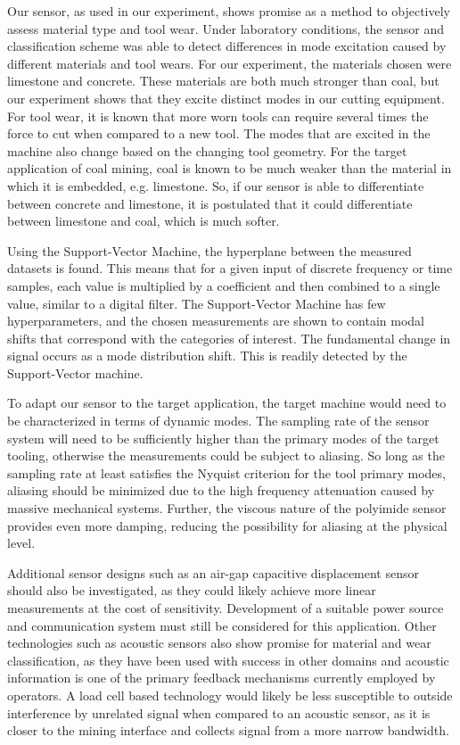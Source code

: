 Our sensor, as used in our experiment, shows promise as a method to objectively assess material type and tool wear.
Under laboratory conditions, the sensor and classification scheme was able to detect differences in 
mode excitation caused by different materials and tool wears. For our experiment, the materials chosen were
limestone and concrete. These materials are both much stronger than coal, but our experiment shows that they
excite distinct modes in our cutting equipment. For tool wear, it is known that more worn tools can
require several times the force to cut when compared to a new tool. The modes that are excited in the
machine also change based on the changing tool geometry. For the target application of coal mining,
coal is known to be much weaker than the material in which it is embedded, e.g. limestone. 
So, if our sensor is able to differentiate between concrete and limestone,
 it is postulated that it could differentiate between limestone and coal, which is much softer.

Using the Support-Vector Machine, the hyperplane between the measured datasets is found. 
This means that for a given input of discrete frequency or time samples, each value is 
 multiplied by a coefficient and then combined to a single value, similar to a digital filter. 
The Support-Vector Machine has few hyperparameters, and the chosen measurements 
 are shown to contain modal shifts that correspond with the categories of interest. 
The fundamental change in signal occurs as a mode distribution shift.
This is readily detected by the Support-Vector machine.

To adapt our sensor to the target application, 
the target machine would need to be characterized in terms of dynamic modes.
The sampling rate of the sensor system will need to be sufficiently higher than
the primary modes of the target tooling, otherwise the measurements could be subject to aliasing.
So long as the sampling rate at least satisfies the Nyquist criterion for the tool primary modes,
aliasing should be minimized due to the high frequency attenuation caused by massive mechanical systems.
Further, the viscous nature of the polyimide sensor provides even more damping, reducing the possibility
for aliasing at the physical level.

Additional sensor designs such as an air-gap capacitive displacement sensor should also be investigated,
 as they could likely achieve more linear measurements at the cost of sensitivity.
Development of a suitable power source and communication system must still be considered for this
application.
Other technologies such as acoustic sensors also show promise for material and wear classification,
 as they have been used with success in other domains and acoustic information is one of the primary 
 feedback mechanisms currently employed by operators. A load cell based technology would likely
be less susceptible to outside interference by unrelated signal when compared to an acoustic sensor,
as it is closer to the mining interface and collects signal from a more narrow bandwidth.


